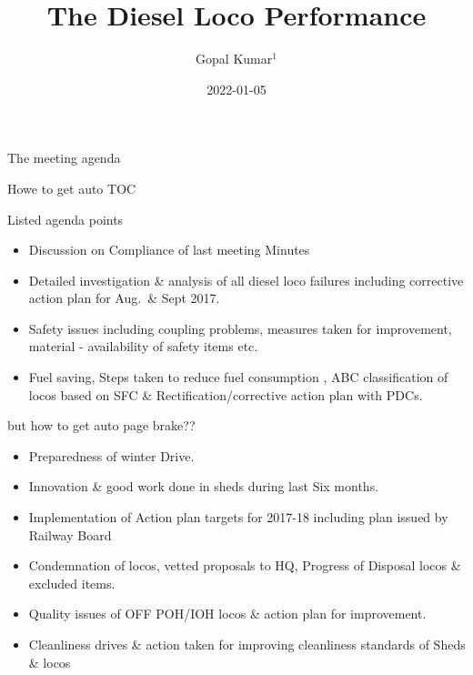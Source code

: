 \documentclass[
  ignorenonframetext,
]{beamer}
\title{The Diesel Loco Performance}
\author{Gopal Kumar\(^1\)}
\date{2022-01-05}
\institute{\(^1\)CMPE(Diesel)}
\providecommand{\tightlist}{%
  \setlength{\itemsep}{0pt}\setlength{\parskip}{0pt}}
\begin{document}
\frame{\titlepage}

\begin{frame}[allowframebreaks]
  \tableofcontents[hideallsubsections]
\end{frame}
\begin{frame}
\end{frame}

\begin{frame}{The meeting agenda}
\protect\hypertarget{the-meeting-agenda}{}
\begin{block}{Howe to get auto TOC}
\protect\hypertarget{howe-to-get-auto-toc}{}
\end{block}
\end{frame}

\begin{frame}{Listed agenda points}
\protect\hypertarget{listed-agenda-points}{}
\begin{itemize}[<+->]
\tightlist
\item
  Discussion on Compliance of last meeting Minutes
\item
  Detailed investigation \& analysis of all diesel loco failures
  including corrective action plan for Aug.~\& Sept 2017.
\item
  Safety issues including coupling problems, measures taken for
  improvement, material - availability of safety items etc.
\item
  Fuel saving, Steps taken to reduce fuel consumption , ABC
  classification of locos based on SFC \& Rectification/corrective
  action plan with PDCs.
\end{itemize}
\end{frame}

\begin{frame}{but how to get auto page brake??}
\protect\hypertarget{but-how-to-get-auto-page-brake}{}
\begin{itemize}[<+->]
\tightlist
\item
  Preparedness of winter Drive.
\item
  Innovation \& good work done in sheds during last Six months.
\item
  Implementation of Action plan targets for 2017-18 including plan
  issued by Railway Board
\item
  Condemnation of locos, vetted proposals to HQ, Progress of Disposal
  locos \& excluded items.
\item
  Quality issues of OFF POH/IOH locos \& action plan for improvement.
\item
  Cleanliness drives \& action taken for improving cleanliness standards
  of Sheds \& locos
\end{itemize}
\end{frame}
\end{document}
